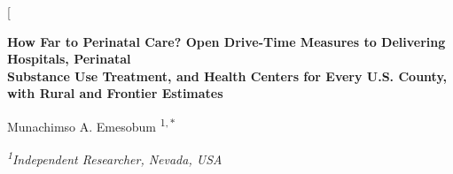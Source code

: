 \documentclass[10pt,twocolumn,letterpaper]{article}
\begin{document}
\twocolumn[
\begin{@twocolumnfalse}
\begin{center}
{\large\bfseries How Far to Perinatal Care? Open Drive-Time Measures to Delivering Hospitals, Perinatal\\[2pt]
Substance Use Treatment, and Health Centers for Every U.S. County, with Rural and Frontier Estimates\par}
\vspace{8pt}
{\normalsize Munachimso A. Emesobum\,\,\textsuperscript{1,\,$*$}\par}
\vspace{3pt}
{\small\itshape \textsuperscript{1}Independent Researcher, Nevada, USA\par}
\vspace{10pt}
\begin{minipage}{0.82\textwidth}
\small

\end{minipage}
\end{center}
\end{@twocolumnfalse}
\end{document}
